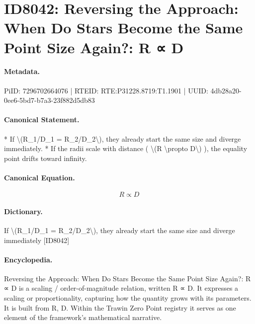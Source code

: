 \section*{ID8042: Reversing the Approach: When Do Stars Become the Same Point Size Again?: R ∝ D}
\paragraph{Metadata.}
PiID: 7296702664076 | RTEID: RTE:P31228.8719:T1.1901 | UUID: 4db28a20-0ee6-5bd7-b7a3-23f882d5db83

\paragraph{Canonical Statement.}
* If \textbackslash{}(R\_1/D\_1 = R\_2/D\_2\textbackslash{}), they already start the same size and diverge immediately. * If the radii scale with distance ( \textbackslash{}(R \textbackslash{}propto D\textbackslash{}) ), the equality point drifts toward infinity.

\paragraph{Canonical Equation.}
\[
R \propto D
\]

\paragraph{Dictionary.}
If \textbackslash{}(R\_1/D\_1 = R\_2/D\_2\textbackslash{}), they already start the same size and diverge immediately [ID8042]

\paragraph{Encyclopedia.}
Reversing the Approach: When Do Stars Become the Same Point Size Again?: R ∝ D is a scaling / order-of-magnitude relation, written R ∝ D. It expresses a scaling or proportionality, capturing how the quantity grows with its parameters. It is built from R, D. Within the Trawin Zero Point registry it serves as one element of the framework's mathematical narrative.
